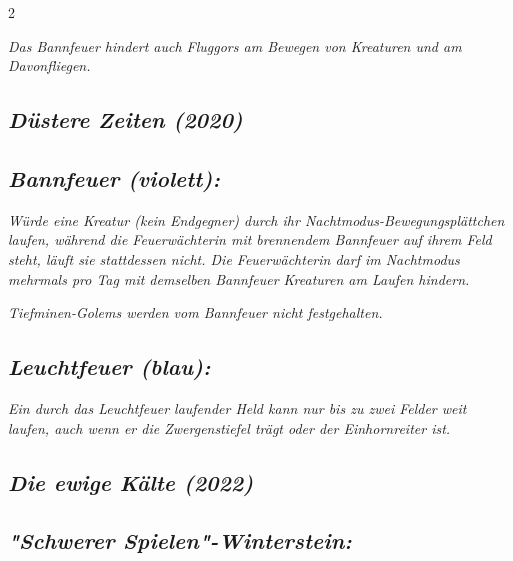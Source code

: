 \documentclass[10pt, a4paper, oneside]{book}
\newcommand{\fan}[1]{\textit{#1}}
\begin{document}
\begin{multicols*}{2}
\begin{bgcolor}[color-bb]
\fan{Das Bannfeuer hindert auch Fluggors am Bewegen von Kreaturen und am Davonfliegen.}






\end{bgcolor}







\begin{bgcolor}[color-dz]
\section{\fan{Düstere Zeiten (2020)}}


\subsection{\fan{Bannfeuer (violett):}}

\fan{Würde eine Kreatur (kein Endgegner) durch ihr Nachtmodus-Bewegungsplättchen laufen, während die Feuerwächterin mit brennendem Bannfeuer auf ihrem Feld steht, läuft sie stattdessen nicht. Die Feuerwächterin darf im Nachtmodus mehrmals pro Tag mit demselben Bannfeuer Kreaturen am Laufen hindern.}

\fan{Tiefminen-Golems werden vom Bannfeuer nicht festgehalten.}


\subsection{\fan{Leuchtfeuer (blau):}}

\fan{Ein durch das Leuchtfeuer laufender Held kann nur bis zu zwei Felder weit laufen, auch wenn er die Zwergenstiefel trägt oder der Einhornreiter ist.}

\end{bgcolor}




\begin{bgcolor}
\section{\fan{Die ewige Kälte (2022)}}



\subsection{\fan{"Schwerer Spielen"-Winterstein:}}


\end{bgcolor}
\end{multicols*}
\end{document}
